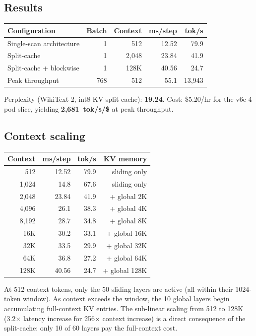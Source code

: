 \subsection{Results}

\begin{tabular}{lrrrr}
\toprule
\textbf{Configuration} & \textbf{Batch} & \textbf{Context} & \textbf{ms/step} & \textbf{tok/s} \\
\midrule
Single-scan architecture & 1 & 512   & 12.52  & 79.9 \\
Split-cache              & 1 & 2{,}048 & 23.84  & 41.9 \\
Split-cache + blockwise  & 1 & 128K  & 40.56  & 24.7 \\
Peak throughput          & 768 & 512  & 55.1   & 13{,}943 \\
\bottomrule
\end{tabular}

\vspace{0.5em}
\noindent Perplexity (WikiText-2, int8 KV split-cache): \textbf{19.24}.
Cost: \$5.20/hr for the v6e-4 pod slice, yielding
\textbf{2{,}681~tok/s/\$} at peak throughput.

\subsection{Context scaling}

\begin{tabular}{rrrr}
\toprule
\textbf{Context} & \textbf{ms/step} & \textbf{tok/s} & \textbf{KV memory} \\
\midrule
512     & 12.52 & 79.9 & sliding only \\
1{,}024 & 14.8  & 67.6 & sliding only \\
2{,}048 & 23.84 & 41.9 & + global 2K \\
4{,}096 & 26.1  & 38.3 & + global 4K \\
8{,}192 & 28.7  & 34.8 & + global 8K \\
16K     & 30.2  & 33.1 & + global 16K \\
32K     & 33.5  & 29.9 & + global 32K \\
64K     & 36.8  & 27.2 & + global 64K \\
128K    & 40.56 & 24.7 & + global 128K \\
\bottomrule
\end{tabular}

\vspace{0.5em}
\noindent At 512 context tokens, only the 50 sliding layers are active
(all within their 1024-token window). As context exceeds the window,
the 10 global layers begin accumulating full-context KV entries. The
sub-linear scaling from 512 to 128K (3.2$\times$ latency increase for
256$\times$ context increase) is a direct consequence of the split-cache:
only 10 of 60 layers pay the full-context cost.

